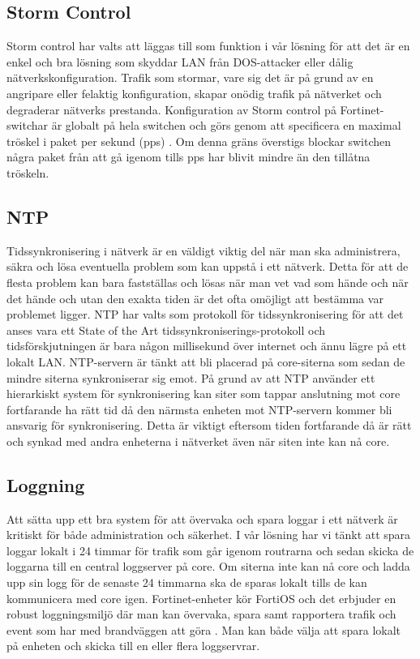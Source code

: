\subsection{Storm Control}
    Storm control har valts att läggas till som funktion i vår lösning för att det är en enkel och bra lösning som skyddar LAN från DOS-attacker eller dålig nätverkskonfiguration. Trafik som stormar, vare sig det är på grund av en angripare eller felaktig konfiguration, skapar onödig trafik på nätverket och degraderar nätverks prestanda. Konfiguration av Storm control på Fortinet-switchar är globalt på hela switchen och görs genom att specificera en maximal tröskel i paket per sekund (pps) \cite[48]{FN_FortiSwitch-Admin-Guide}. Om denna gräns överstigs blockar switchen några paket från att gå igenom tills pps har blivit mindre än den tillåtna tröskeln.

\subsection{NTP}
    Tidssynkronisering i nätverk är en väldigt viktig del när man ska administrera, säkra och lösa eventuella problem som kan uppstå i ett nätverk. Detta för att de flesta problem kan bara fastställas och lösas när man vet vad som hände och när det hände och utan den exakta tiden är det ofta omöjligt att bestämma var problemet ligger. NTP har valts som protokoll för tidssynkronisering för att det anses vara ett State of the Art tidssynkroniserings-protokoll och tidsförskjutningen är bara någon millisekund över internet och ännu lägre på ett lokalt LAN. NTP-servern är tänkt att bli placerad på core-siterna som sedan de mindre siterna synkroniserar sig emot. På grund av att NTP använder ett hierarkiskt system för synkronisering kan siter som tappar anslutning mot core fortfarande ha rätt tid då den närmsta enheten mot NTP-servern kommer bli ansvarig för synkronisering. Detta är viktigt eftersom tiden fortfarande då är rätt och synkad med andra enheterna i nätverket även när siten inte kan nå core.

\subsection{Loggning}
    Att sätta upp ett bra system för att övervaka och spara loggar i ett nätverk är kritiskt för både administration och säkerhet. I vår lösning har vi tänkt att spara loggar lokalt i 24 timmar för trafik som går igenom routrarna och sedan skicka de loggarna till en central loggserver på core. Om siterna inte kan nå core och ladda upp sin logg för de senaste 24 timmarna ska de sparas lokalt tills de kan kommunicera med core igen. Fortinet-enheter kör FortiOS och det erbjuder en robust loggningsmiljö där man kan övervaka, spara samt rapportera trafik och event som har med brandväggen att göra \cite{FN_FortiGate-Logging}. Man kan både välja att spara lokalt på enheten och skicka till en eller flera loggservrar.

